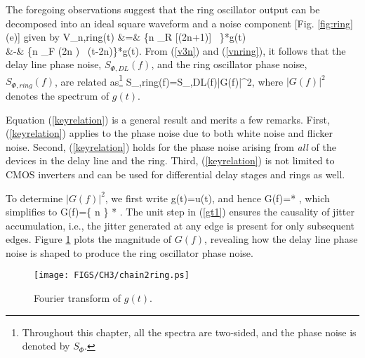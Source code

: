 The foregoing observations suggest that the ring oscillator output can be decomposed into an ideal square waveform and a noise component [Fig. \ref{fig:ring}(e)] given by
\ber
V_{n,ring}(t) &=& \left\{\SumAll n \sigma_R [(2n+1)] ~\delta [t-(2n+1)\frac{T_{in}}{2}]\right\}*g(t) \nonumber\\
&-& \left\{\SumAll n \sigma_F (2n ) ~\delta (t-2n)\right\}*g(t).
\label{vnring}
\eer
From (\ref{v3n}) and (\ref{vnring}), it follows that the delay line phase noise, $S_{\Phi,DL}(f)$, and the ring oscillator phase noise, $S_{\Phi,ring}(f)$, are related
as\footnote{Throughout this chapter, all the spectra are two-sided, and the phase noise is denoted by $S_{\Phi}$.}
\beq
S_{\Phi,ring}(f)=S_{\Phi,DL}(f)|G(f)|^2,
\label{keyrelation}
\eeq
where $|G(f)|^2$ denotes the spectrum of $g(t)$.

Equation (\ref{keyrelation}) is a general result and merits a few remarks. First, (\ref{keyrelation}) applies to the phase noise due to both white noise and flicker
noise. Second, (\ref{keyrelation}) holds for the phase noise arising from {\em all} of the devices in the delay line and the ring. Third, (\ref{keyrelation}) is not limited to CMOS
inverters and can be used for differential delay stages and rings as well.

To determine $|G(f)|^2$, we first write
\beq
g(t)= u(t),
\label{gt1}
\eeq
and hence
\beq
G(f)= * ,
\label{gf1}
\eeq
which simplifies to 
\beq
G(f)=\left\{ \SumAll n \delta [f-(2n+1)f_{in}]\right\} * .
\label{gf2}
\eeq
The unit step in (\ref{gt1}) ensures the causality of jitter accumulation, i.e., the jitter generated at any edge is present for only subsequent edges.
Figure \ref{fig:chain2ring} plots the magnitude of $G(f)$, revealing how the delay line phase noise is shaped to produce the ring oscillator phase noise.
\begin{figure}[htb!]
\centering
\texttt{[image: FIGS/CH3/chain2ring.ps]}
\caption{Fourier transform of $g(t)$.}
\label{fig:chain2ring}
\end{figure}

